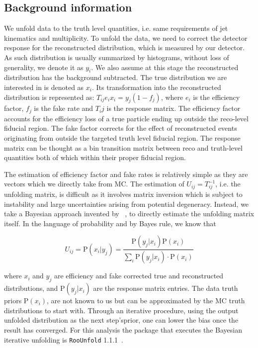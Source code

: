 \subsection{Background information}
\label{sec:gbb-unfoldingintro}

We unfold data to the truth level quantities, i.e. same requirements of jet kinematics and multiplicity. To unfold the data, we need to correct the detector response for the reconstructed distribution, which is measured by our detector. As such distribution is usually summarized by histograms, without loss of generality, we denote it as $y_i$. We also assume at this stage the reconstructed distribution has the background subtracted. The true distribution we are interested in is denoted as $x_i$. Its transformation into the reconstructed distribution is represented as: $T_{ij}e_ix_i = y_j (1-f_j)$, where $e_i$ is the efficiency factor, $f_j$ is the fake rate and $T_ij$ is the response matrix. The efficiency factor accounts for the efficiency loss of a true particle ending up outside the reco-level fiducial region. The fake factor corrects for the effect of reconstructed events originating from outside the targeted truth level fiducial region. The response matrix can be thought as a bin transition matrix between reco and truth-level quantities both of which within their proper fiducial region.

The estimation of efficiency factor and fake rates is relatively simple as they are vectors which we directly take from MC. The estimation of $U_{ij}=T_{ij}^{-1}$, i.e. the unfolding matrix, is difficult as it involves matrix inversion which is subject to instability and large uncertainties arising from potential degeneracy. Instead, we take a Bayesian approach invented by ~\cite{D'Agostini:1994zf}, to directly estimate the unfolding matrix itself. In the language of probability and by Bayes rule, we know that

\begin{equation}
  U_{ij} = \mathrm{P}(x_i|y_j) = \frac{\mathrm{P}(y_j|x_i)\mathrm{P}(x_i)}{\sum_i \mathrm{P}(y_j|x_i)\cdot \mathrm{P}(x_i)}
  \label{eqn:unfolding:final}
\end{equation}

where $x_i$ and $y_j$ are efficiency and fake corrected true and reconstructed distributions, and $\mathrm{P}(y_j|x_i)$ are the response matrix entries. The data truth priors $\mathrm{P}(x_i)$, are not known to us but can be approximated by the MC truth distributions to start with. Through an iterative procedure, using the output unfolded distribution as the next step'sprior, one can lower the bias once the result has converged. For this analysis the package that executes the Bayesian iterative unfolding is \texttt{RooUnfold} 1.1.1~\cite{Adye:2011gm}.


